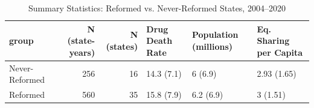 \begin{table}[!h]
\centering
\caption{\label{tab:tab:summary}Summary Statistics: Reformed vs. Never-Reformed States, 2004--2020}
\centering
\begin{tabular}[t]{lrrlll}
\toprule
group & N (state-years) & N (states) & Drug Death Rate & Population (millions) & Eq. Sharing per Capita\\
\midrule
Never-Reformed & 256 & 16 & 14.3 (7.1) & 6 (6.9) & 2.93 (1.65)\\
Reformed & 560 & 35 & 15.8 (7.9) & 6.2 (6.9) & 3 (1.51)\\
\bottomrule
\end{tabular}
\end{table}

